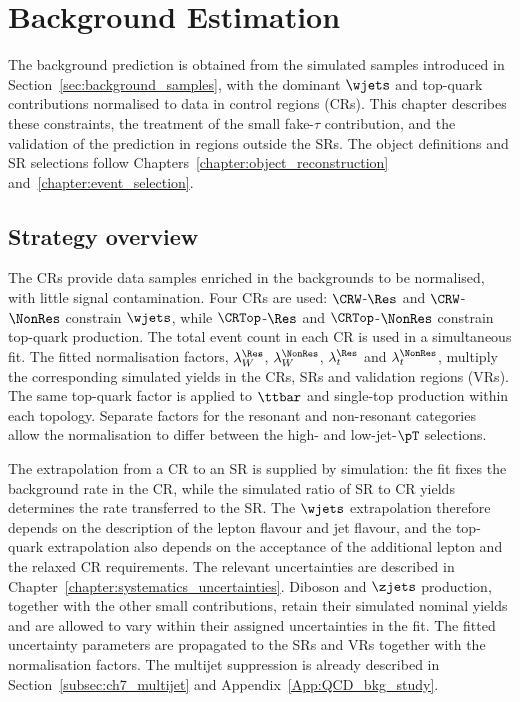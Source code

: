 \chapter{Background Estimation}
\label{chapter:background_estimation}

The background prediction is obtained from the simulated samples introduced in Section~\ref{sec:background_samples}, with the dominant $\wjets$ and top-quark contributions normalised to data in control regions (CRs).
This chapter describes these constraints, the treatment of the small fake-$\tau$ contribution, and the validation of the prediction in regions outside the SRs.
The object definitions and SR selections follow Chapters~\ref{chapter:object_reconstruction} and~\ref{chapter:event_selection}.

\section{Strategy overview}
\label{sec:ch8_strategy}

The CRs provide data samples enriched in the backgrounds to be normalised, with little signal contamination.
Four CRs are used: $\CRW$-$\Res$ and $\CRW$-$\NonRes$ constrain $\wjets$, while $\CRTop$-$\Res$ and $\CRTop$-$\NonRes$ constrain top-quark production.
The total event count in each CR is used in a simultaneous fit.
The fitted normalisation factors, $\lambda_W^{\Res}$, $\lambda_W^{\NonRes}$, $\lambda_t^{\Res}$ and $\lambda_t^{\NonRes}$, multiply the corresponding simulated yields in the CRs, SRs and validation regions (VRs).
The same top-quark factor is applied to $\ttbar$ and single-top production within each topology.
Separate factors for the resonant and non-resonant categories allow the normalisation to differ between the high- and low-jet-$\pT$ selections.

The extrapolation from a CR to an SR is supplied by simulation: the fit fixes the background rate in the CR, while the simulated ratio of SR to CR yields determines the rate transferred to the SR.
The $\wjets$ extrapolation therefore depends on the description of the lepton flavour and jet flavour, and the top-quark extrapolation also depends on the acceptance of the additional lepton and the relaxed CR requirements.
The relevant uncertainties are described in Chapter~\ref{chapter:systematics_uncertainties}.
Diboson and $\zjets$ production, together with the other small contributions, retain their simulated nominal yields and are allowed to vary within their assigned uncertainties in the fit.
The fitted uncertainty parameters are propagated to the SRs and VRs together with the normalisation factors.
The multijet suppression is already described in Section~\ref{subsec:ch7_multijet} and Appendix~\ref{App:QCD_bkg_study}.


